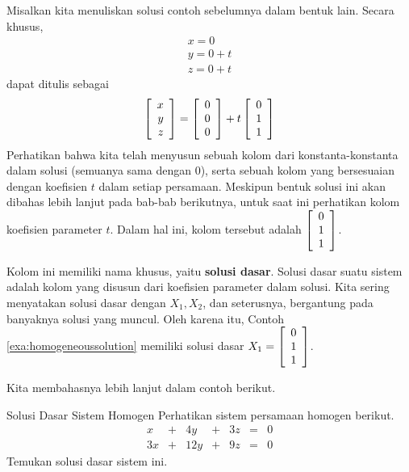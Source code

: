 Misalkan kita menuliskan solusi contoh sebelumnya dalam bentuk lain.
Secara khusus,
\begin{equation*}
\begin{array}{c}
x = 0 \\
y = 0 + t \\
z = 0 + t
\end{array}
\end{equation*}
dapat ditulis sebagai
\begin{equation*}
\left[
\begin{array}{r}
x\\
y\\
z
\end{array}
\right]
 =
\left[
\begin{array}{r}
0\\
0\\
0
\end{array}
\right]
 +
t
\left[
\begin{array}{r}
0\\
1\\
1
\end{array}
\right]
\end{equation*}
Perhatikan bahwa kita telah menyusun sebuah kolom dari konstanta-konstanta dalam solusi (semuanya sama dengan $0$),
 serta sebuah kolom yang bersesuaian dengan
koefisien $t$ dalam setiap persamaan. Meskipun bentuk solusi ini akan dibahas lebih lanjut pada bab-bab berikutnya,
untuk saat ini perhatikan kolom koefisien
parameter $t$. Dalam hal ini, kolom tersebut adalah
$\left[
\begin{array}{r}
0\\
1\\
1
\end{array}
\right]$. 

Kolom ini memiliki nama khusus, yaitu \textbf{solusi dasar}. Solusi dasar suatu sistem
adalah kolom yang disusun dari koefisien parameter dalam solusi. Kita sering menyatakan solusi dasar
dengan $X_1, X_2$, dan seterusnya, bergantung pada banyaknya solusi yang muncul. Oleh karena itu, Contoh \ref{exa:homogeneoussolution}
memiliki solusi dasar $X_1 = \left[
\begin{array}{r}
0\\
1\\
1
\end{array}
\right]$. 

Kita membahasnya lebih lanjut dalam contoh berikut.

\begin{example}{Solusi Dasar Sistem Homogen}\label{exa:basicsolutions}
Perhatikan sistem persamaan homogen berikut.
\begin{equation*}
\begin{array}{cccccccc}
x &+& 4y &+& 3z &=& 0 \\
3x &+& 12y &+& 9z &=& 0
\end{array}
\end{equation*}
Temukan solusi dasar sistem ini.
\end{example}

